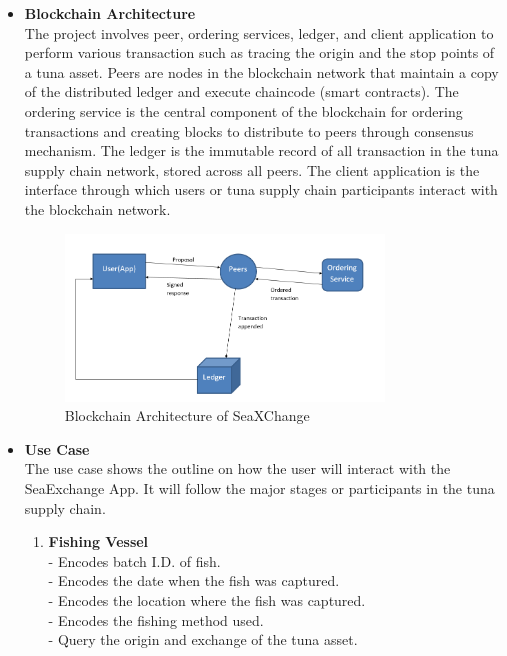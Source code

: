 	\begin{itemize}
		\item \textbf{Blockchain Architecture}
		\\The project involves peer, ordering services, ledger, and client application to perform various transaction such as tracing the origin and the stop points of a tuna asset. Peers are nodes in the blockchain network that maintain a copy of the distributed ledger and execute chaincode (smart contracts). The ordering service is the central component of the blockchain for ordering transactions and creating blocks to distribute to peers through consensus mechanism. The ledger is the immutable record of all transaction in the tuna supply chain network, stored across all peers. The client application is the interface through which users or tuna supply chain participants interact with the blockchain network.
		
		\begin{figure}[H]
			\centering
			\includegraphics[width=0.8\textwidth]{SeaXChange_model.png}
			\caption{Blockchain Architecture of SeaXChange}
			\label{fig:blockchain_model}
		\end{figure}
		
		
		
		\item \textbf{Use Case}
		\\The use case shows the outline on how the user will interact with the SeaExchange App. It will follow the major stages or participants in the tuna supply chain. 
		\begin{enumerate}
			\item \textbf{Fishing Vessel}
			\\- Encodes batch I.D. of fish.
			\\- Encodes the date when the fish was captured.
			\\- Encodes the location where the fish was captured.
			\\- Encodes the fishing method used.
			\\- Query the origin and exchange of the tuna asset.
			

\end{enumerate}
\end{itemize}
